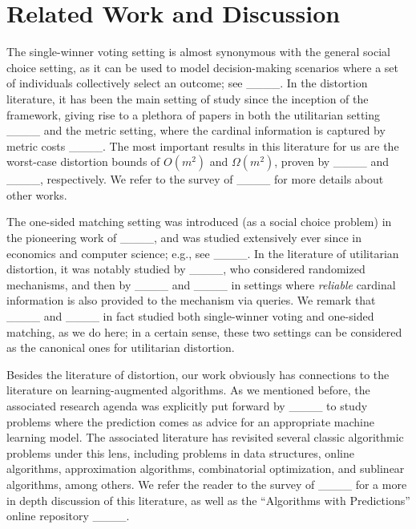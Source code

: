 \section{Related Work and Discussion}
The single-winner voting setting is almost synonymous with the general social choice setting, as it can be used to model decision-making scenarios where a set of individuals collectively select an outcome; see ____. In the distortion literature, it has been the main setting of study since the inception of the framework, giving rise to a plethora of papers in both the utilitarian setting ____ and the metric setting, where the cardinal information is captured by metric costs ____. The most important results in this literature for us are the worst-case distortion bounds of $O(m^2)$ and $\Omega(m^2)$, proven by ____ and ____, respectively. We refer to the survey of ____ for more details about other works. 

The one-sided matching setting was introduced (as a social choice problem) in the pioneering work of ____, and was studied extensively ever since in economics and computer science; e.g., see ____. In the literature of utilitarian distortion, it was notably studied by ____, who considered randomized mechanisms, and then by ____ and ____ in settings where \emph{reliable} cardinal information is also provided to the mechanism via queries. We remark that ____ and ____ in fact studied both single-winner voting and one-sided matching, as we do here; in a certain sense, these two settings can be considered as the canonical ones for utilitarian distortion. 

Besides the literature of distortion, our work obviously has connections to the literature on learning-augmented algorithms. As we mentioned before, the associated research agenda was explicitly put forward by ____ to study problems where the prediction comes as advice for an appropriate machine learning model. The associated literature has revisited several classic algorithmic problems under this lens, including problems in data structures, online algorithms, approximation algorithms, combinatorial optimization, and sublinear algorithms, among others. We refer the reader to the survey of ____ for a more in depth discussion of this literature, as well as the ``Algorithms with Predictions'' online repository ____. 


